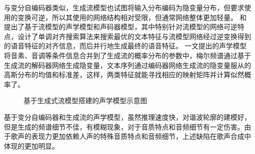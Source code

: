 与变分自编码器类似，生成流模型也试图将输入分布编码为隐变量分布，但要求使用的变换可逆，所以其使用的网络结构相对受限，但通常网络整体更加轻量。
\citet{waveglow}和\citet{kim2020glow}提出了基于流模型的声学模型和声码器模型，其中\citet{kim2020glow}特别针对流模型的网络可逆特点，设计了单调对齐搜索算法来搜索最优的文本特征与流模型网络经过逆变换得到的语音特征的对齐信息，而后并行地生成最终的语音特征。
\citet{kim2020glow}一文提出的声学模型将音素、音调等条件信息合并到了生成流的概率分布的参数中，梅尔频谱通过基于生成流的解码器网络生成隐变量，文本序列通过编码器网络生成流的隐变量服从的高斯分布的均值和标准差，这样，两类特征就能寻找相应的映射矩阵并计算似然概率了。
\begin{figure}[htbp]
  \caption{基于生成式流模型搭建的声学模型示意图}
\end{figure}
基于变分自编码器和生成流的声学模型，虽然推理速度快，对谐波轮廓的建模好，但是生成的频谱细节不佳，有模糊现象，对于音质特点和音频细节有一定伤害。由于歌声的表现力更加依赖人声的特殊音质特点和音频细节，上述缺陷在歌声合成中体现的更加明显。

